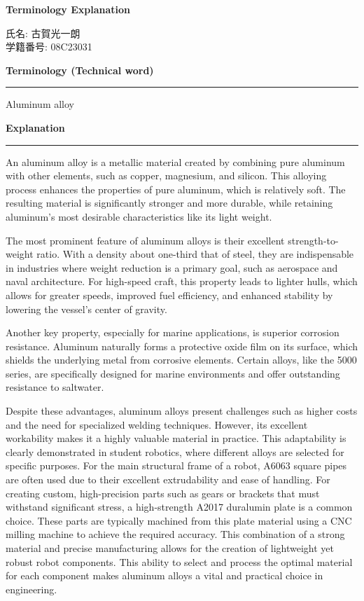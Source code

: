 \documentclass[10.5pt, a4paper]{article}
\begin{document}
\begin{center}
    \Large{\textbf{Terminology Explanation}}
\end{center}

\vspace{1cm} %


\noindent 氏名: 古賀光一朗 \\ 
学籍番号: 08C23031 
\vspace{1.5cm} %

\noindent\large{\textbf{Terminology (Technical word)}}
\hrule
\vspace{0.3cm}
\noindent Aluminum alloy

\vspace{1cm} %

\noindent\large{\textbf{Explanation}}
\hrule
\vspace{0.3cm}
An aluminum alloy is a metallic material created by combining pure aluminum with other elements, such as copper, magnesium, and silicon. This alloying process enhances the properties of pure aluminum, which is relatively soft. The resulting material is significantly stronger and more durable, while retaining aluminum's most desirable characteristics like its light weight.

The most prominent feature of aluminum alloys is their excellent strength-to-weight ratio. With a density about one-third that of steel, they are indispensable in industries where weight reduction is a primary goal, such as aerospace and naval architecture. For high-speed craft, this property leads to lighter hulls, which allows for greater speeds, improved fuel efficiency, and enhanced stability by lowering the vessel's center of gravity.

Another key property, especially for marine applications, is superior corrosion resistance. Aluminum naturally forms a protective oxide film on its surface, which shields the underlying metal from corrosive elements. Certain alloys, like the 5000 series, are specifically designed for marine environments and offer outstanding resistance to saltwater.

Despite these advantages, aluminum alloys present challenges such as higher costs and the need for specialized welding techniques. However, its excellent workability makes it a highly valuable material in practice. This adaptability is clearly demonstrated in student robotics, where different alloys are selected for specific purposes. For the main structural frame of a robot, A6063 square pipes are often used due to their excellent extrudability and ease of handling. For creating custom, high-precision parts such as gears or brackets that must withstand significant stress, a high-strength A2017 duralumin plate is a common choice. These parts are typically machined from this plate material using a CNC milling machine to achieve the required accuracy. This combination of a strong material and precise manufacturing allows for the creation of lightweight yet robust robot components. This ability to select and process the optimal material for each component makes aluminum alloys a vital and practical choice in engineering.
\end{document}
